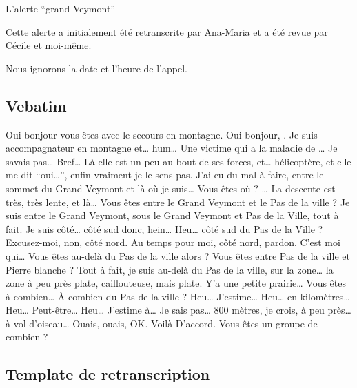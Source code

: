 L'alerte \enquote{grand Veymont}


Cette alerte a initialement été retranscrite par Ana-Maria
 et a été revue par Cécile  et
moi-même.

Nous ignorons la date et l'heure de l'appel.

\subsection{Vebatim}
\label{anx:retrans-gv-verb}


\begin{dialogue*}
  \Sec Oui bonjour vous êtes avec le secours en montagne.
  \Req Oui bonjour, . Je suis accompagnateur en
  montagne et… hum… Une victime qui a la maladie de …
  Je savais pas… Bref… Là elle est un peu au bout de ses forces, et…
   hélicoptère, et elle me dit \enquote{oui…}, enfin
  vraiment je le sens pas. J'ai eu du mal à faire, entre le sommet du
  Grand Veymont et là où je suis…
  \Sec {} Vous êtes où ?
  \Req … La descente est très, très lente, et là…
  \Sec {} Vous êtes entre le Grand Veymont
  et le Pas de la ville ?
  \Req Je suis entre le Grand Veymont, sous le Grand Veymont et Pas de
  la Ville, tout à fait. Je suis côté… côté sud donc, hein…
  \Sec Heu… côté sud du Pas de la Ville ?
  \Req Excusez-moi, non, côté nord. Au temps pour moi, côté nord,
  pardon. C'est moi qui…
  \Sec Vous êtes au-delà du Pas de la ville alors ? Vous êtes entre
  Pas de la ville et Pierre blanche ?
  \Req Tout à fait, je suis au-delà du Pas de la ville, sur la zone…
  la zone à peu près plate, caillouteuse, mais plate. Y'a une petite
  prairie…
  \Sec Vous êtes à combien… À combien du Pas de la ville ?
  \Req Heu… J'estime… Heu… en kilomètres… Heu… Peut-être… Heu…
  J'estime à… Je sais pas… 800 mètres, je crois, à peu près… à vol
  d'oiseau…
  \Sec Ouais, ouais, OK.
  \Req Voilà
  \Sec D'accord. Vous êtes un groupe de combien ?
\end{dialogue*}


\subsection{Template de retranscription}
\label{anx:retrans-gv-retrans}

